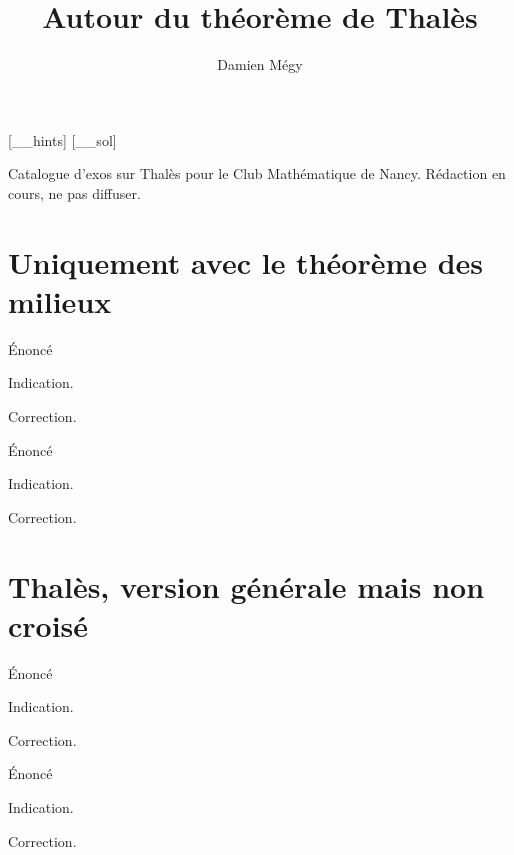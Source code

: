 




[_\jobname_hints]
[_\jobname_sol]


\title{Autour du théorème de Thalès}
\author{Damien Mégy}
\maketitle

Catalogue d'exos sur Thalès pour le Club Mathématique de Nancy. Rédaction en cours, ne pas diffuser. 

\tableofcontents

\section{Uniquement avec le théorème des milieux}

\begin{exo}
Énoncé
\begin{hint}
Indication.
\end{hint}
\begin{sol}
Correction.
\end{sol}
\end{exo}

\begin{exo}
Énoncé
\begin{hint}
Indication.
\end{hint}
\begin{sol}
Correction.
\end{sol}
\end{exo}


\section{Thalès, version générale mais non croisé}

\begin{exo}
Énoncé
\begin{hint}
Indication.
\end{hint}
\begin{sol}
Correction.
\end{sol}
\end{exo}

\begin{exo}
Énoncé
\begin{hint}
Indication.
\end{hint}
\begin{sol}
Correction.
\end{sol}
\end{exo}

